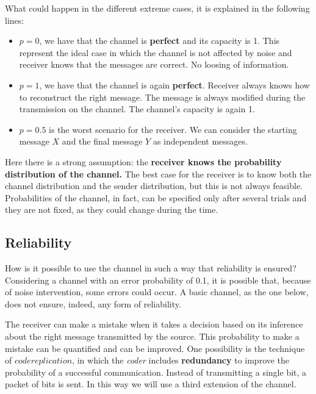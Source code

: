 What could happen in the different extreme cases, it is explained in the following lines:
\begin{itemize}
	\item $p = 0$, we have that the channel is \textbf{perfect} and its capacity is 1. This represent the ideal case in which the channel is not affected by noise and receiver knows that the messages are correct. No loosing of information.
	
	\item $p = 1$, we have that the channel is again \textbf{perfect}. Receiver always knows how to reconstruct the right message. The message is always modified during the transmission on the channel. The channel's capacity is again 1.
	
	\item $p=0.5$ is the worst scenario for the receiver. We can consider the starting message $X$ and the final message $Y$ as independent messages.
\end{itemize}
Here there is a strong assumption: the \textbf{receiver knows the probability distribution of the channel.}
The best case for the receiver is to know both the channel distribution and the sender distribution, but this is not always feasible.
Probabilities of the channel, in fact, can be specified only after several trials and they are not fixed, as they could change during the time.

\subsection{Reliability}
How is it possible to use the channel in such a way that reliability is ensured?\\
Considering a channel with an error probability of 0.1, it is possible that, because of noise intervention, some errors could occur. A basic channel, as the one below, does not ensure, indeed, any form of reliability.

The receiver can make a mistake when it takes a decision based on its inference about the right message transmitted by the source. This probability to make a mistake can be quantified and can be improved. One possibility is the technique of $code replication$, in which the \textit{coder} includes \textbf{redundancy} to improve the probability of a successful communication. Instead of transmitting a single bit, a packet of bits is sent. In this way we will use a third extension of the channel.

